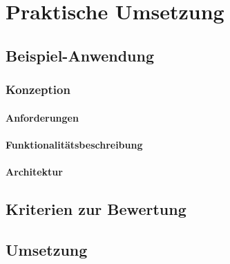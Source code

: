 \chapter{Praktische Umsetzung} \label{chap:praxis} 

\section{Beispiel-Anwendung}\label{sec:bsp-app} 

\subsection{Konzeption}

\subsubsection{Anforderungen} %


\subsubsection{Funktionalitätsbeschreibung}	%

\subsubsection{Architektur}

\section{Kriterien zur Bewertung}\label{sec:kriterien}

\section{Umsetzung} \label{sec:umsetzung}	%

